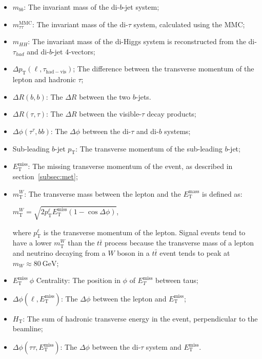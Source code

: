 \begin{itemize}
\item $m_{bb}$: The invariant mass of the di-$b$-jet system;
\item $m_{\tau\tau}^\mathrm{MMC}$: The invariant mass of the di-$\tau$ system, calculated using the MMC;
\item $m_{HH}$: The invariant mass of the di-Higgs system is reconstructed from the di-$\tau_{had}$ and di-$b$-jet 4-vectors;
\item $\Delta p_\mathrm{T}(\ell, \tau_\mathrm{had-vis})$; The difference between the transverse momentum of the lepton and hadronic $\tau$;
\item $\Delta  R(b, b)$: The  $\Delta R$ between the two $b$-jets.
\item $\Delta  R(\tau, \tau)$: The  $\Delta R$ between the visible-$\tau$ decay products;
\item $\Delta\phi(\tau^\tau, bb)$: The $\Delta\phi$ between the di-$\tau$ and di-$b$ systems;
\item Sub-leading $b$-jet $p_\mathrm{T}$: The transverse momentum of the sub-leading $b$-jet;
\item $E^\mathrm{miss}_\mathrm{T}$: The missing transverse momentum of the event, as described in section~\ref{subsec:met};
\item $m_\mathrm{T}^W$: The transverse mass between the lepton and the $E_\mathrm{T}^\mathrm{mass}$ is defined as:

$m_\mathrm{T}^W=\sqrt{2p_\mathrm{T}^\ell E_\mathrm{T}^\mathrm{miss}(1-\cos\Delta\phi)}$,

where $p_\mathrm{T}^\ell$ is the transverse momentum of the lepton. Signal events tend to have a lower $m_\mathrm{T}^W$ than the $t\bar t$ process because the transverse mass of a lepton and neutrino decaying from a $W$ boson in a $t\bar t$ event tends to peak at $m_W\approx 80~\mathrm{GeV}$;

\item $E^\mathrm{miss}_\mathrm{T}~\phi$ Centrality: The position in $\phi$ of $E_{T}^{\mathrm{miss}}$ between taus;
\item $\Delta\phi(\ell, E^\mathrm{miss}_\mathrm{T})$: The $\Delta\phi$ between the lepton and $E^\mathrm{miss}_\mathrm{T}$;
\item $H_\mathrm{T}$: The sum of hadronic transverse energy in the event, perpendicular to the beamline;
\item $\Delta\phi(\tau\tau, E^\mathrm{miss}_\mathrm{T})$: The $\Delta\phi$ between the di-$\tau$ system and $E^\mathrm{miss}_\mathrm{T}$.
\end{itemize}

